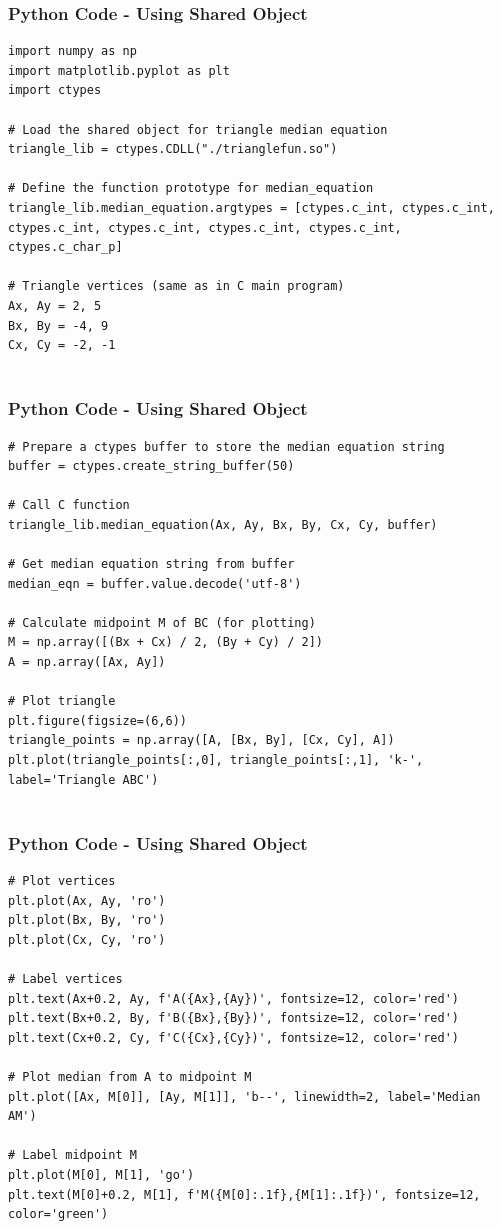 \documentclass{beamer}
\numberwithin{equation}{section}
\begin{document}
\begin{frame}[fragile]
    \frametitle{Python Code - Using Shared Object}
    \begin{lstlisting}
import numpy as np
import matplotlib.pyplot as plt
import ctypes

# Load the shared object for triangle median equation
triangle_lib = ctypes.CDLL("./trianglefun.so")

# Define the function prototype for median_equation
triangle_lib.median_equation.argtypes = [ctypes.c_int, ctypes.c_int, ctypes.c_int, ctypes.c_int, ctypes.c_int, ctypes.c_int, ctypes.c_char_p]

# Triangle vertices (same as in C main program)
Ax, Ay = 2, 5
Bx, By = -4, 9
Cx, Cy = -2, -1


\end{lstlisting}
\end{frame}

\begin{frame}[fragile]
    \frametitle{Python Code - Using Shared Object}
    \begin{lstlisting}
# Prepare a ctypes buffer to store the median equation string
buffer = ctypes.create_string_buffer(50)

# Call C function
triangle_lib.median_equation(Ax, Ay, Bx, By, Cx, Cy, buffer)

# Get median equation string from buffer
median_eqn = buffer.value.decode('utf-8')

# Calculate midpoint M of BC (for plotting)
M = np.array([(Bx + Cx) / 2, (By + Cy) / 2])
A = np.array([Ax, Ay])

# Plot triangle
plt.figure(figsize=(6,6))
triangle_points = np.array([A, [Bx, By], [Cx, Cy], A])
plt.plot(triangle_points[:,0], triangle_points[:,1], 'k-', label='Triangle ABC')


\end{lstlisting}
\end{frame}
\begin{frame}[fragile]
    \frametitle{Python Code - Using Shared Object}
    \begin{lstlisting}
# Plot vertices
plt.plot(Ax, Ay, 'ro')
plt.plot(Bx, By, 'ro')
plt.plot(Cx, Cy, 'ro')

# Label vertices
plt.text(Ax+0.2, Ay, f'A({Ax},{Ay})', fontsize=12, color='red')
plt.text(Bx+0.2, By, f'B({Bx},{By})', fontsize=12, color='red')
plt.text(Cx+0.2, Cy, f'C({Cx},{Cy})', fontsize=12, color='red')

# Plot median from A to midpoint M
plt.plot([Ax, M[0]], [Ay, M[1]], 'b--', linewidth=2, label='Median AM')

# Label midpoint M
plt.plot(M[0], M[1], 'go')
plt.text(M[0]+0.2, M[1], f'M({M[0]:.1f},{M[1]:.1f})', fontsize=12, color='green')


\end{lstlisting}
\end{frame}
\end{document}
